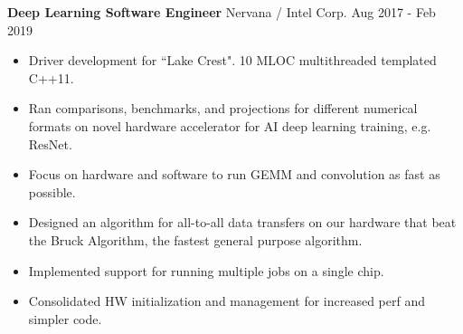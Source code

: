 \textbf{Deep Learning Software Engineer}  Nervana / Intel Corp. \hfill Aug 2017 - Feb 2019

\begin{itemize} \itemsep -2pt

\item Driver development for ``Lake Crest". 10 MLOC multithreaded templated C++11.

\item Ran comparisons, benchmarks, and projections for different numerical formats on novel hardware accelerator
      for AI deep learning training, e.g. ResNet.

\item Focus on hardware and software to run GEMM and convolution as fast as possible.

\item Designed an algorithm for all-to-all data transfers on our hardware that beat the Bruck Algorithm,
      the fastest general purpose algorithm.

\item Implemented support for running multiple jobs on a single chip.

\item Consolidated HW initialization and management for increased perf and simpler code.

\end{itemize}
